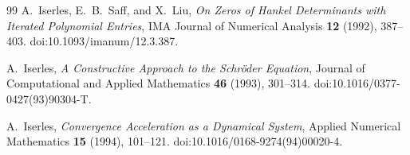 \documentclass[11pt]{article}
\theoremstyle{remark}
\begin{document}
\begin{thebibliography}{99}
A.~Iserles, E.~B.~Saff, and X.~Liu,
\newblock \emph{On Zeros of Hankel Determinants with Iterated Polynomial Entries},
\newblock IMA Journal of Numerical Analysis \textbf{12} (1992), 387--403.
\newblock doi:10.1093/imanum/12.3.387.

A.~Iserles,
\newblock \emph{A Constructive Approach to the Schr\"oder Equation},
\newblock Journal of Computational and Applied Mathematics \textbf{46} (1993), 301--314.
\newblock doi:10.1016/0377-0427(93)90304-T.

A.~Iserles,
\newblock \emph{Convergence Acceleration as a Dynamical System},
\newblock Applied Numerical Mathematics \textbf{15} (1994), 101--121.
\newblock doi:10.1016/0168-9274(94)00020-4.

\end{thebibliography}
\end{document}
